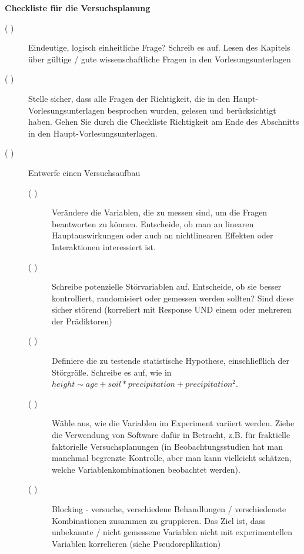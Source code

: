 \documentclass[a4paper,twoside]{tufte-book}\usepackage[]{graphicx}\usepackage[]{color}
\begin{document}
\newpage
\begin{mdframed}
    
\textbf{Checkliste für die Versuchsplanung}

\begin{description}

\item[( )] Eindeutige, logisch einheitliche Frage? Schreib es auf. Lesen des Kapitels über gültige / gute wissenschaftliche Fragen in den Vorlesungsunterlagen

\item[( )] Stelle sicher, dass alle Fragen der Richtigkeit, die in den Haupt-Vorlesungsunterlagen besprochen wurden, gelesen und berücksichtigt haben. Gehen Sie durch die Checkliste Richtigkeit am Ende des Abschnitts in den Haupt-Vorlesungsunterlagen.

\item[( )] Entwerfe einen Versuchsaufbau

  \begin{description}

  \item[( )] Verändere die Variablen, die zu messen sind, um die Fragen beantworten zu können. Entscheide, ob man an linearen Hauptauswirkungen oder auch an nichtlinearen Effekten oder Interaktionen interessiert ist.
  
  \item[( )] Schreibe potenzielle Störvariablen auf. Entscheide, ob sie besser kontrolliert, randomisiert oder gemessen werden sollten? Sind diese sicher störend (korreliert mit Response UND einem oder mehreren der Prädiktoren)
  
  \item[( )] Definiere die zu testende statistische Hypothese, einschließlich der Störgröße. Schreibe es auf, wie in $height  \sim age + soil * precipitation + precipitation^2$. 
  
  \item[( )] Wähle aus, wie die Variablen im Experiment variiert werden. Ziehe die Verwendung von Software dafür in Betracht, z.B. für fraktielle faktorielle Versuchsplanungen (in Beobachtungsstudien hat man manchmal begrenzte Kontrolle, aber man kann vielleicht schätzen, welche Variablenkombinationen beobachtet werden).
  
  \item[( )] Blocking - versuche, verschiedene Behandlungen / verschiedenste Kombinationen zusammen zu gruppieren. Das Ziel ist, dass unbekannte / nicht gemessene Variablen nicht mit experimentellen Variablen korrelieren (siehe Pseudoreplikation)
  

\end{description}
\end{description}
\end{mdframed}
\end{document}
